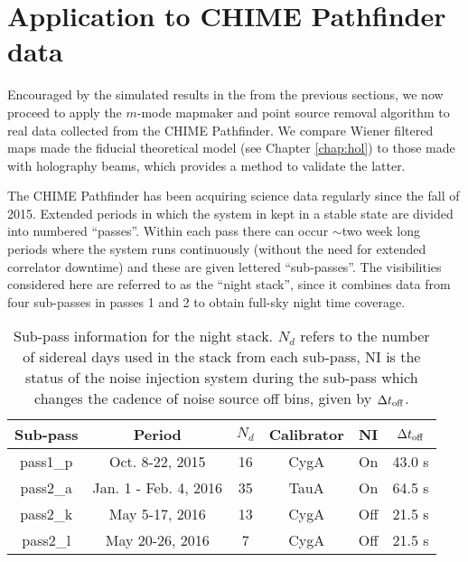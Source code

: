 \section{Application to CHIME Pathfinder data}
\label{ch:mm:sec:pfdata}
Encouraged by the simulated results in the from the previous sections, we now proceed to apply the $m$-mode mapmaker and point source removal algorithm to real data collected from the CHIME Pathfinder. We compare Wiener filtered maps made the fiducial theoretical model (see Chapter \ref{chap:hol}) to those made with holography beams, which provides a method to validate the latter.

The CHIME Pathfinder has been acquiring science data regularly since the fall of 2015. Extended periods in which the system in kept in a stable state are divided into numbered ``passes''. Within each pass there can occur $\sim$two week long periods where the system runs continuously (without the need for extended correlator downtime) and these are given lettered ``sub-passes''. The visibilities considered here are referred to as the ``night stack'', since it combines data from four sub-passes in passes 1 and 2 to obtain full-sky night time coverage.

\begin{table}[ht]
\begin{center}
\begin{tabular}{| c | c | c | c | c | c |}
\hline
Sub-pass  & Period & $N_d$ & Calibrator & NI & $\Delta t_{\rm off}$ \\ \hline
pass1\_p & Oct. 8-22, 2015 & 16 & CygA & On & 43.0 s \\ \hline
pass2\_a & Jan. 1 - Feb. 4, 2016 & 35 & TauA & On & 64.5 s\\ \hline
pass2\_k & May 5-17, 2016 & 13 & CygA & Off & 21.5 s \\ \hline
pass2\_l  & May 20-26, 2016 & 7 & CygA & Off & 21.5 s \\ \hline
\end{tabular}
\end{center}
\caption{Sub-pass information for the night stack. $N_d$ refers to the number of sidereal days used in the stack from each sub-pass, NI is the status of the noise injection system during the sub-pass which changes the cadence of noise source off bins, given by $\Delta t_{\rm off}$. \label{subpass_table}} 
\end{table}

